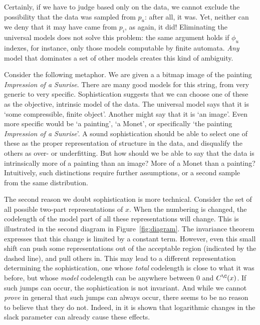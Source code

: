 Certainly, if we have to judge based only on the data, we cannot exclude the possibility that the data was sampled from $p_u$: after all, it was. Yet, neither can we deny that it may have came from $p_i$, as again, it did!  Eliminating the universal models does not solve this problem: the same argument holds if $\phi_u$ indexes, for instance, only those models computable by finite automata. \emph{Any} model that dominates a set of other models creates this kind of ambiguity.

Consider the following metaphor. We are given a a bitmap image of the painting \emph{Impression of a Sunrise}. There are many good models for this string, from very generic to very specific. Sophistication suggests that we can choose one of these as the objective, intrinsic model of the data. The universal model says that it is `some compressible, finite object'. Another might say that it is `an image'. Even more specific would be `a painting', `a Monet', or specifically `the painting \emph{Impression of a Sunrise}'. A sound sophistication should be able to select one of these as the proper representation of structure in the data, and disqualify the others as over- or underfitting. But how should we be able to say that the data is intrinsically more of a painting than an image? More of a Monet than a painting? Intuitively, such distinctions require further assumptions, or a second sample from the same distribution.

The second reason we doubt sophistication is more technical. Consider the set of all possible two-part representations of $x$. When the numbering is changed, the codelength of the model part of all these representations will change. This is illustrated in the second diagram in Figure~\ref{fig:diagram}. The invariance theorem expresses that this change is limited by a constant term. However, even this small shift can push some representations out of the acceptable region (indicated by the dashed line), and pull others in. This may lead to a different representation determining the sophistication, one whose \emph{total} codelength is close to what it was before, but whose \emph{model} codelength can be anywhere between $0$ and $C^\C(x)$. If such jumps can occur, the sophistication is not invariant. And while we cannot \emph{prove} in general that such jumps can always occur, there seems to be no reason to believe that they do not. Indeed, in \cite{antunes2013sophistication} it is shown that logarithmic changes in the slack parameter can already cause these effects.

